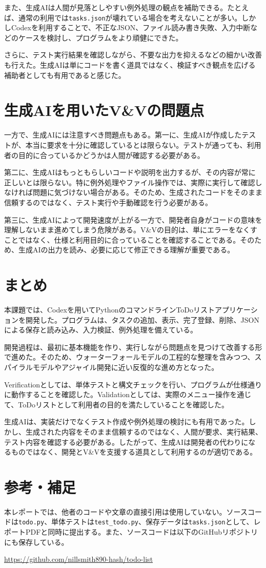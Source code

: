\documentclass[uplatex,a4paper,11pt]{jsarticle}
\begin{document}
また、生成AIは人間が見落としやすい例外処理の観点を補助できる。たとえば、通常の利用では\texttt{tasks.json}が壊れている場合を考えないことが多い。しかしCodexを利用することで、不正なJSON、ファイル読み書き失敗、入力中断などのケースを検討し、プログラムをより頑健にできた。

さらに、テスト実行結果を確認しながら、不要な出力を抑えるなどの細かい改善も行えた。生成AIは単にコードを書く道具ではなく、検証すべき観点を広げる補助者としても有用であると感じた。

\section{生成AIを用いたV\&Vの問題点}

一方で、生成AIには注意すべき問題点もある。第一に、生成AIが作成したテストが、本当に要求を十分に確認しているとは限らない。テストが通っても、利用者の目的に合っているかどうかは人間が確認する必要がある。

第二に、生成AIはもっともらしいコードや説明を出力するが、その内容が常に正しいとは限らない。特に例外処理やファイル操作では、実際に実行して確認しなければ問題に気づけない場合がある。そのため、生成されたコードをそのまま信頼するのではなく、テスト実行や手動確認を行う必要がある。

第三に、生成AIによって開発速度が上がる一方で、開発者自身がコードの意味を理解しないまま進めてしまう危険がある。V\&Vの目的は、単にエラーをなくすことではなく、仕様と利用目的に合っていることを確認することである。そのため、生成AIの出力を読み、必要に応じて修正できる理解が重要である。

\section{まとめ}

本課題では、Codexを用いてPythonのコマンドラインToDoリストアプリケーションを開発した。プログラムは、タスクの追加、表示、完了登録、削除、JSONによる保存と読み込み、入力検証、例外処理を備えている。

開発過程は、最初に基本機能を作り、実行しながら問題点を見つけて改善する形で進めた。そのため、ウォーターフォールモデルの工程的な整理を含みつつ、スパイラルモデルやアジャイル開発に近い反復的な進め方となった。

Verificationとしては、単体テストと構文チェックを行い、プログラムが仕様通りに動作することを確認した。Validationとしては、実際のメニュー操作を通じて、ToDoリストとして利用者の目的を満たしていることを確認した。

生成AIは、実装だけでなくテスト作成や例外処理の検討にも有用であった。しかし、生成された内容をそのまま信頼するのではなく、人間が要求、実行結果、テスト内容を確認する必要がある。したがって、生成AIは開発者の代わりになるものではなく、開発とV\&Vを支援する道具として利用するのが適切である。

\section*{参考・補足}

本レポートでは、他者のコードや文章の直接引用は使用していない。ソースコードは\texttt{todo.py}、単体テストは\texttt{test\_todo.py}、保存データは\texttt{tasks.json}として、レポートPDFと同時に提出する。また、ソースコードは以下のGitHubリポジトリにも保存している。

\begin{center}
\url{https://github.com/nillsmith890-hash/todo-list}
\end{center}
\end{document}
